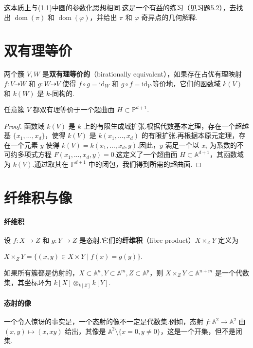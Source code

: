 这本质上与(1.1)中圆的参数化思想相同.这是一个有益的练习（见习题5.2），去找出 \(\operatorname{dom}(\pi)\) 和 \(\operatorname{dom}(\varphi)\)，并给出 \(\pi\) 和 \(\varphi\) 奇异点的几何解释.

\section{双有理等价}

\begin{definition}
两个簇 \(V, W\) 是\textbf{双有理等价的}（birationally equivalent），如果存在占优有理映射 \(f : V \dashrightarrow W\) 和 \(g : W \dashrightarrow V\) 使得 \(f \circ g = \mathrm{id}_W\) 和 \(g \circ f = \mathrm{id}_V\).等价地，它们的函数域 \(k(V)\) 和 \(k(W)\) 是 \(k\)-同构的.
\end{definition}

\begin{theorem}
任意簇 \(V\) 都双有理等价于一个超曲面 \(H \subset {\mathbb{P}}^{d+1}\).
\end{theorem}
\begin{proof}
函数域 \(k(V)\) 是 \(k\) 上的有限生成域扩张.根据代数基本定理，存在一个超越基 \(\{x_1, \ldots, x_d\}\)，使得 \(k(V)\) 是 \(k(x_1, \ldots, x_d)\) 的有限扩张.再根据本原元定理，存在一个元素 \(y\) 使得 \(k(V) = k(x_1, \ldots, x_d, y)\).因此，\(y\) 满足一个以 \(x_i\) 为系数的不可约多项式方程 \(F(x_1, \ldots, x_d, y) = 0\).这定义了一个超曲面 \(H \subset {\mathbb{A}}^{d+1}\)，其函数域为 \(k(V)\).通过取其在 \({\mathbb{P}}^{d+1}\) 中的闭包，我们得到所需的超曲面.
\end{proof}

\section{纤维积与像}

\paragraph{纤维积} 设 \(f: X \to Z\) 和 \(g: Y \to Z\) 是态射.它们的\textbf{纤维积}（fibre product）\(X \times_Z Y\) 定义为

\(
X \times_Z Y = \{ (x,y) \in X \times Y \mid f(x) = g(y) \}.
\)

如果所有簇都是仿射的，\(X \subset {\mathbb{A}}^n, Y \subset {\mathbb{A}}^m, Z \subset {\mathbb{A}}^p\)，则 \(X \times_Z Y \subset {\mathbb{A}}^{n+m}\) 是一个代数集，其坐标环为 \(k[X] \otimes_{k[Z]} k[Y]\).

\paragraph{态射的像} 一个令人惊讶的事实是，一个态射的像不一定是代数集.例如，态射 \(f: {\mathbb{A}}^2 \to {\mathbb{A}}^2\) 由 \((x,y) \mapsto (x, xy)\) 给出，其像是 \({\mathbb{A}}^2 \setminus \{x=0, y \neq 0\}\)，这是一个开集，但不是闭集.

